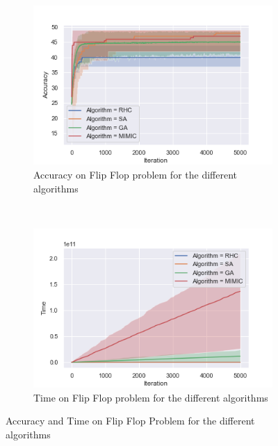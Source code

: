 \documentclass[twocolumn, 10pt]{article}
\begin{document}
				\begin{figure}[h]
					\centering
					\begin{subfigure}[t]{0.45\columnwidth}
						\centering
						\includegraphics[width=\linewidth]{../graphics/flip_flop_all_Iteration_Error_Algorithm.png}
						\caption{Accuracy on Flip Flop problem for the different algorithms}
						\label{ff:all_accuracy}
					\end{subfigure}
					~
					\begin{subfigure}[t]{0.45\columnwidth}
						\centering
						\includegraphics[width=\linewidth]{../graphics/flip_flop_all_Iteration_Time_Algorithm.png}
						\caption{Time on Flip Flop problem for the different algorithms}
						\label{ff:all_time}
					\end{subfigure}
					\caption{Accuracy and Time on Flip Flop Problem for the different algorithms}
					\label{ff:all}
				\end{figure}
\end{document}
